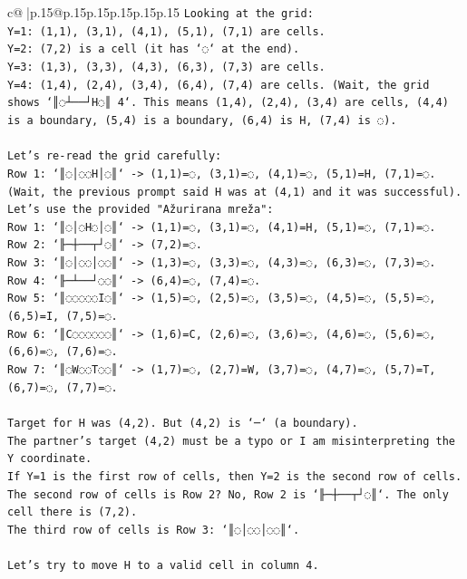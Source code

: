 \documentclass{article}
\begin{document}
{\begin{supertabular}{c@{$\;$}|p{.15\linewidth}@{}p{.15\linewidth}p{.15\linewidth}p{.15\linewidth}p{.15\linewidth}p{.15\linewidth}}
{{{\texttt{Looking at the grid:} \\
\texttt{Y=1: (1,1), (3,1), (4,1), (5,1), (7,1) are cells.} \\
\texttt{Y=2: (7,2) is a cell (it has `◌` at the end).} \\
\texttt{Y=3: (1,3), (3,3), (4,3), (6,3), (7,3) are cells.} \\
\texttt{Y=4: (1,4), (2,4), (3,4), (6,4), (7,4) are cells. (Wait, the grid shows `║◌┴──┘H◌║ 4`. This means (1,4), (2,4), (3,4) are cells, (4,4) is a boundary, (5,4) is a boundary, (6,4) is H, (7,4) is ◌).} \\
\\ 
\texttt{Let's re{-}read the grid carefully:} \\
\texttt{Row 1: `║◌│◌◌H│◌║` {-}> (1,1)=◌, (3,1)=◌, (4,1)=◌, (5,1)=H, (7,1)=◌. (Wait, the previous prompt said H was at (4,1) and it was successful).} \\
\texttt{Let's use the provided "Ažurirana mreža":} \\
\texttt{Row 1: `║◌│◌H◌│◌║` {-}> (1,1)=◌, (3,1)=◌, (4,1)=H, (5,1)=◌, (7,1)=◌.} \\
\texttt{Row 2: `╟─┼──┬┘◌║` {-}> (7,2)=◌.} \\
\texttt{Row 3: `║◌│◌◌│◌◌║` {-}> (1,3)=◌, (3,3)=◌, (4,3)=◌, (6,3)=◌, (7,3)=◌.} \\
\texttt{Row 4: `╟─┴──┘◌◌║` {-}> (6,4)=◌, (7,4)=◌.} \\
\texttt{Row 5: `║◌◌◌◌◌I◌║` {-}> (1,5)=◌, (2,5)=◌, (3,5)=◌, (4,5)=◌, (5,5)=◌, (6,5)=I, (7,5)=◌.} \\
\texttt{Row 6: `║C◌◌◌◌◌◌║` {-}> (1,6)=C, (2,6)=◌, (3,6)=◌, (4,6)=◌, (5,6)=◌, (6,6)=◌, (7,6)=◌.} \\
\texttt{Row 7: `║◌W◌◌T◌◌║` {-}> (1,7)=◌, (2,7)=W, (3,7)=◌, (4,7)=◌, (5,7)=T, (6,7)=◌, (7,7)=◌.} \\
\\ 
\texttt{Target for H was (4,2). But (4,2) is `─` (a boundary).} \\
\texttt{The partner's target (4,2) must be a typo or I am misinterpreting the Y coordinate.} \\
\texttt{If Y=1 is the first row of cells, then Y=2 is the second row of cells.} \\
\texttt{The second row of cells is Row 2? No, Row 2 is `╟─┼──┬┘◌║`. The only cell there is (7,2).} \\
\texttt{The third row of cells is Row 3: `║◌│◌◌│◌◌║`.} \\
\\ 
\texttt{Let's try to move H to a valid cell in column 4.} \\
}}}
\end{supertabular}}
\end{document}
